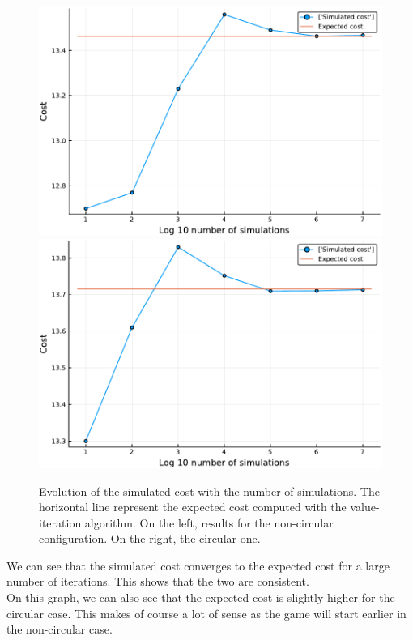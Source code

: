 \begin{figure}[H]
\centering
\includegraphics[scale=0.41]{../img/board_unif_low/cost_iterations_log_noncirc.pdf}
\includegraphics[scale=0.41]{../img/board_unif_low/cost_iterations_log_circ.pdf}
\caption{Evolution of the simulated cost with the number of simulations. The horizontal line represent the expected cost computed with the value-iteration algorithm. On the left, results for the non-circular configuration. On the right, the circular one.}
\label{fig:cost_iterations_log}
\end{figure}

We can see that the simulated cost converges to the expected cost for a large number of iterations.
This shows that the two are consistent. \\
On this graph, we can also see that the expected cost is slightly higher for the circular case. 
This makes of course a lot of sense as the game will start earlier in the non-circular case. 

